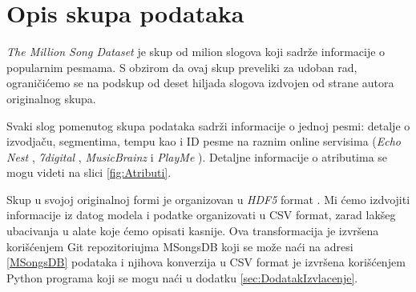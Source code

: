 \section{Opis skupa podataka}
\label{sec:Opis skupa podataka}

\emph{The Million Song Dataset} \cite{Dataset} je skup od milion slogova koji sadr\v{z}e informacije o popularnim pesmama. S obzirom da ovaj skup preveliki za udoban rad, ograni\v{c}i\'c{}emo se na podskup od deset hiljada slogova izdvojen od strane autora originalnog skupa.

Svaki slog pomenutog skupa podataka sadr\v{z}i informacije o jednoj pesmi: detalje o izvodja\v{c}u, segmentima, tempu kao i ID pesme na raznim online servisima (\emph{Echo Nest} \cite{EchoNest}, \emph{7digital} \cite{7digital},  \emph{MusicBrainz} \cite{MusicBrainz} i \emph{PlayMe} \cite{PlayMe}). Detaljne informacije o atributima se mogu videti na slici \ref{fig:Atributi}.

Skup u svojoj originalnoj formi je organizovan u \emph{HDF5} format \cite{HDF5}. Mi \'c{}emo izdvojiti informacije iz datog modela i podatke organizovati u CSV format, zarad lak\v{s}eg ubacivanja u alate koje \'c{}emo opisati kasnije. Ova transformacija je izvr\v{s}ena kori\v{s}\'c{}enjem Git repozitoriujma MSongsDB koji se mo\v{z}e na\'c{}i na adresi \ref{MSongsDB} podataka i njihova konverzija u CSV format je izvr\v{s}ena kori\v{s}\'c{}enjem Python programa koji se mogu na\'c{}i u dodatku \ref{sec:DodatakIzvlacenje}.


